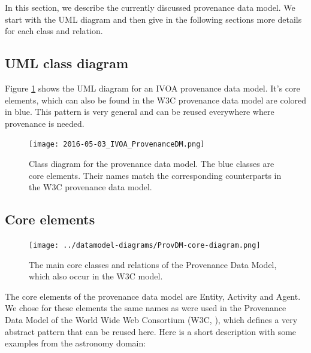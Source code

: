 In this section, we describe the currently discussed provenance data model. We 
start with the UML diagram and then give in the following sections more details 
for each class and relation.

\subsection{UML class diagram}
Figure \ref{fig:classdiagram} shows the UML diagram for an IVOA provenance data
model. It's core elements, which can also be found in the W3C provenance data
model are colored in blue. This pattern is very general and can be reused everywhere 
where provenance is needed. 

\begin{figure}[h]
\centering
\texttt{[image: 2016-05-03\_IVOA\_ProvenanceDM.png]}
\caption{Class diagram for the provenance data model. The blue classes are core 
elements. Their names match the corresponding counterparts in the W3C provenance 
data model.}
\label{fig:classdiagram}
\end{figure}



\subsection{Core elements}\label{sec:core}

\begin{figure}[h]
\centering
\texttt{[image: ../datamodel-diagrams/ProvDM-core-diagram.png]}
\caption{The main core classes and relations of the Provenance Data Model, which also occur in the W3C model.}
\label{fig:coreclasses}
\end{figure}


The core elements of the provenance data model are Entity, Activity and Agent. 
We chose for these elements the same names as were used in the Provenance Data 
Model of the World Wide Web Consortium (W3C, \cite{std:W3CProvDM}), which defines 
a very abstract pattern that can be reused here. Here is a short description with 
some examples from the astronomy domain:

